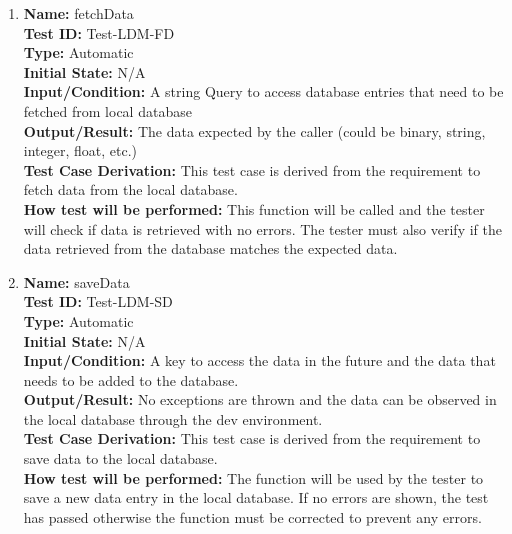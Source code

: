 \documentclass[12pt, titlepage]{article}
\begin{document}
\begin{enumerate}

  \item \textbf{Name:} fetchData \label{itm:Test-LDM-FD} \\
        \textbf{Test ID:} Test-LDM-FD \\
        \textbf{Type:} Automatic \\
        \textbf{Initial State:} N/A \\
        \textbf{Input/Condition:} A string Query to access database entries that need to be fetched from local database \\
        \textbf{Output/Result:} The data expected by the caller (could be binary, string, integer, float, etc.) \\
        \textbf{Test Case Derivation:} This test case is derived from the requirement to fetch data from the local database. \\
        \textbf{How test will be performed:} This function will be called and the tester will check if data is retrieved with no errors. The tester must also verify if the data retrieved from the database matches the expected data. \\

  \item \textbf{Name:} saveData \label{itm:Test-LDM-SD} \\
        \textbf{Test ID:} Test-LDM-SD \\
        \textbf{Type:} Automatic \\
        \textbf{Initial State:} N/A \\
        \textbf{Input/Condition:} A key to access the data in the future and the data that needs to be added to the database. \\
        \textbf{Output/Result:} No exceptions are thrown and the data can be observed in the local database through the dev environment. \\
        \textbf{Test Case Derivation:} This test case is derived from the requirement to save data to the local database. \\
        \textbf{How test will be performed:} The function will be used by the tester to save a new data entry in the local database. If no errors are shown, the test has passed otherwise the function must be corrected to prevent any errors. \\


\end{enumerate}
\end{document}
